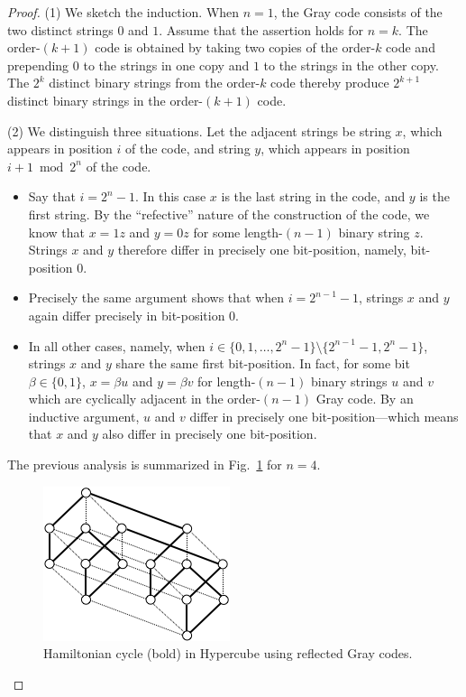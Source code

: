 \begin{proof}
(1) We sketch the induction.  When $n=1$, the Gray code consists of
the two distinct strings $0$ and $1$.  Assume that the assertion holds
for $n=k$.  The order-$(k+1)$ code is obtained by taking two copies of
the order-$k$ code and prepending $0$ to the strings in one copy and
$1$ to the strings in the other copy.  The $2^k$ distinct binary
strings from the order-$k$ code thereby produce $2^{k+1}$ distinct
binary strings in the order-$(k+1)$ code.

(2) We distinguish three situations.  Let the adjacent strings be
string $x$, which appears in position $i$ of the code, and string $y$,
which appears in position $i+1 \bmod 2^n$ of the code.
  \begin{itemize}
  \item
Say that $i = 2^n-1$.  In this case $x$ is the last string in the
code, and $y$ is the first string.  By the ``refective'' nature of the
construction of the code, we know that $x = 1z$ and $y = 0z$ for some
length-$(n-1)$ binary string $z$.  Strings $x$ and $y$ therefore
differ in precisely one bit-position, namely, bit-position $0$.

  \item
Precisely the same argument shows that when $i = 2^{n-1} -1$, strings
$x$ and $y$ again differ precisely in bit-position $0$.

  \item
In all other cases, namely, when $i \in \{0,1, \ldots, 2^n-1\}
\setminus \{2^{n-1} -1, 2^n-1\}$, strings $x$ and $y$ share the same
first bit-position.  In fact, for some bit $\beta \in \{0,1\}$, $x =
\beta u$ and $y = \beta v$ for length-$(n-1)$ binary strings $u$ and
$v$ which are cyclically adjacent in the order-$(n-1)$ Gray code.  By
an inductive argument, $u$ and $v$ differ in precisely one
bit-position---which means that $x$ and $y$ also differ in precisely
one bit-position.
  \end{itemize}
  The previous analysis is summarized in Fig.~\ref{fig:HamiltonHypercude} for $n=4$.
  \begin{figure}[hbt]
\begin{center}
       \includegraphics[scale=0.6]{FiguresGraph/HamiltonHypercube}
       \caption{Hamiltonian cycle (bold) in Hypercube using reflected Gray codes.}
  \label{fig:HamiltonHypercude}
\end{center}
\end{figure}



\end{proof}
